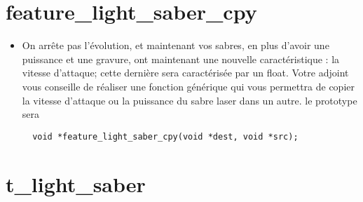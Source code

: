\documentclass{koala-en}
\begin{document}
\chapter{feature\_light\_saber\_cpy}

\begin{itemize}
  \item
On arrête pas l'évolution, et maintenant vos sabres, en plus d'avoir une puissance et une gravure, ont maintenant une nouvelle caractéristique : la vitesse d'attaque;
cette dernière sera caractérisée par un float.
Votre adjoint vous conseille de réaliser une fonction générique qui vous permettra de copier la vitesse d'attaque ou la puissance du sabre laser dans un autre.
le prototype sera 
\begin{lstlisting}
  void *feature_light_saber_cpy(void *dest, void *src);
\end{lstlisting}
\end{itemize}
\newpage

\chapter{t\_light\_saber}

\end{document}
